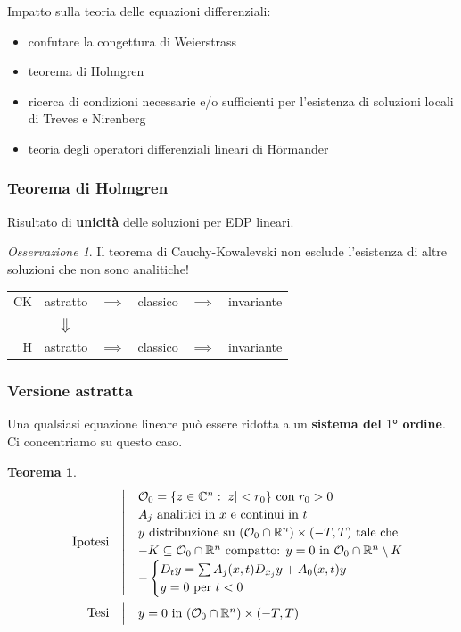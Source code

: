 \documentclass[serif,notheorems]{beamer}
\makeatletter
\newenvironment{ipotesi}%
{\quad\left|\quad\def\arraystretch{1.2}\begin{array}{@{}l@{}}}%
{\end{array}\right.}
\newcommand{\hpth}[2]
{
\begin{align*}
\quad
\text{Ipotesi}
&\begin{ipotesi}
#1
\end{ipotesi}\\
\text{Tesi}
&\begin{ipotesi}
#2
\end{ipotesi}
\end{align*}
}
\theoremstyle{definition} %
\newtheorem{theorem}{Teorema}[section] %
\theoremstyle{remark}
\newtheorem*{remark}{Osservazione}
\makeatother
\begin{document}
\begin{frame}
Impatto sulla teoria delle equazioni differenziali:
\begin{itemize}
\item confutare la congettura di Weierstrass
\item teorema di Holmgren
\item ricerca di condizioni necessarie e/o sufficienti per l'esistenza di soluzioni locali di Treves e Nirenberg
\item teoria degli operatori differenziali lineari di Hörmander
\end{itemize}
\end{frame}

\begin{frame}
\frametitle{Teorema di Holmgren}
Risultato di \textbf{unicità} delle soluzioni per EDP lineari.
\begin{remark}
Il teorema di Cauchy-Kowalevski non esclude l'esistenza di altre soluzioni che non sono analitiche!
\end{remark}
\end{frame}

\begin{frame}
\begin{table}
\renewcommand{\arraystretch}{1.5}
\begin{tabular}{r||ccccc} 
CK & astratto & $\implies$  & classico & $\implies$ & invariante\\
&$\big\Downarrow$ &&&&\\
H & astratto & $\implies$ & classico & $\implies$ & invariante\\
\end{tabular}
\end{table}
\end{frame}

\begin{frame}
\frametitle{Versione astratta}
Una qualsiasi equazione lineare può essere ridotta a un \textbf{sistema del $1$° ordine}. Ci concentriamo su questo caso. 
\begin{theorem}
\vspace{-5mm}
\hpth{
\mathcal{O}_0= \{ z\in \mathbb{C}^n: |z|<r_0 \} \text{ con } r_0>0\\
A_j \text{ analitici in } x \text{ e continui in } t\\
y \text{ distribuzione su } (\mathcal{O}_0 \cap \mathbb{R}^n) \times (-T,T) \text{ tale che}\\
- K\subseteq  \mathcal{O}_0 \cap \mathbb{R}^n \text{ compatto: } y=0  \text{ in } \mathcal{O}_0 \cap \mathbb{R}^n \setminus K\\
- \begin{cases}
D_t y = \sum A_j (x,t) D_{x_j}y+A_0(x,t)y \\
y=0 \text{ per } t<0
\end{cases}\\
}{
y = 0 \text{ in } (\mathcal{O}_0 \cap \mathbb{R}^n) \times (-T,T) \\
}
\end{theorem}
\end{frame}
\end{document}
